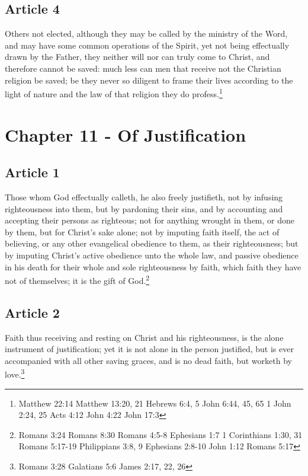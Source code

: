 \documentclass[12pt,letterpaper]{book}
\begin{document}
\section{Article 4}

Others not elected, although they may be called by the ministry of the Word, and may have some common operations of the Spirit, yet not being effectually drawn by the Father, they neither will nor can truly come to Christ, and therefore cannot be saved: much less can men that receive not the Christian religion be saved; be they never so diligent to frame their lives according to the light of nature and the law of that religion they do profess.\footnote{Matthew 22:14 Matthew 13:20, 21 Hebrews 6:4, 5 John 6:44, 45, 65 1 John 2:24, 25 Acts 4:12 John 4:22 John 17:3}

\chapter{Chapter 11 - Of Justification}
\section{Article 1}

Those whom God effectually calleth, he also freely justifieth, not by infusing righteousness into them, but by pardoning their sins, and by accounting and accepting their persons as righteous; not for anything wrought in them, or done by them, but for Christ's sake alone; not by imputing faith itself, the act of believing, or any other evangelical obedience to them, as their righteousness; but by imputing Christ's active obedience unto the whole law, and passive obedience in his death for their whole and sole righteousness by faith, which faith they have not of themselves; it is the gift of God.\footnote{Romans 3:24 Romans 8:30 Romans 4:5-8 Ephesians 1:7 1 Corinthians 1:30, 31 Romans 5:17-19 Philippians 3:8, 9 Ephesians 2:8-10 John 1:12 Romans 5:17}

\section{Article 2}

Faith thus receiving and resting on Christ and his righteousness, is the alone instrument of justification; yet it is not alone in the person justified, but is ever accompanied with all other saving graces, and is no dead faith, but worketh by love.\footnote{Romans 3:28 Galatians 5:6 James 2:17, 22, 26}
\end{document}
